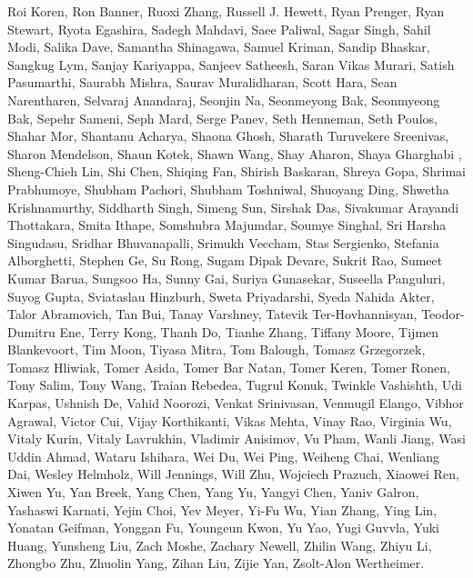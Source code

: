 Roi Koren, Ron Banner, Ruoxi Zhang, Russell J. Hewett, Ryan Prenger, Ryan Stewart, Ryota Egashira, Sadegh Mahdavi, Saee Paliwal, Sagar Singh, Sahil Modi, Salika Dave, Samantha Shinagawa, Samuel Kriman, Sandip Bhaskar, Sangkug Lym, Sanjay Kariyappa, Sanjeev Satheesh, Saran Vikas Murari, Satish Pasumarthi, Saurabh Mishra, Saurav Muralidharan, Scott Hara, Sean Narentharen, Selvaraj Anandaraj, Seonjin Na, Seonmeyong Bak, Seonmyeong Bak, Sepehr Sameni, Seph Mard, Serge Panev, Seth Henneman, Seth Poulos, Shahar Mor, Shantanu Acharya, Shaona Ghosh, Sharath Turuvekere Sreenivas, Sharon Mendelson, Shaun Kotek, Shawn Wang, Shay Aharon, Shaya Gharghabi , Sheng-Chieh Lin, Shi Chen, Shiqing Fan, Shirish Baskaran, Shreya Gopa, Shrimai Prabhumoye, Shubham Pachori, Shubham Toshniwal, Shuoyang Ding, Shwetha Krishnamurthy, Siddharth Singh, Simeng Sun, Sirshak Das, Sivakumar Arayandi Thottakara, Smita Ithape, Somshubra Majumdar, Soumye Singhal, Sri Harsha Singudasu, Sridhar Bhuvanapalli, Srimukh Veccham, Stas Sergienko, Stefania Alborghetti, Stephen Ge, Su Rong, Sugam Dipak Devare, Sukrit Rao, Sumeet Kumar Barua, Sungsoo Ha, Sunny Gai, Suriya Gunasekar, Suseella Panguluri, Suyog Gupta, Sviataslau Hinzburh, Sweta Priyadarshi, Syeda Nahida Akter, Talor Abramovich, Tan Bui, Tanay Varshney, Tatevik Ter-Hovhannisyan, Teodor-Dumitru Ene, Terry Kong, Thanh Do, Tianhe Zhang, Tiffany Moore, Tijmen Blankevoort, Tim Moon, Tiyasa Mitra, Tom Balough, Tomasz Grzegorzek, Tomasz Hliwiak, Tomer Asida, Tomer Bar Natan, Tomer Keren, Tomer Ronen, Tony Salim, Tony Wang, Traian Rebedea, Tugrul Konuk, Twinkle Vashishth, Udi Karpas, Ushnish De, Vahid Noorozi, Venkat Srinivasan, Venmugil Elango, Vibhor Agrawal, Victor Cui, Vijay Korthikanti, Vikas Mehta, Vinay Rao, Virginia Wu, Vitaly Kurin, Vitaly Lavrukhin, Vladimir Anisimov, Vu Pham, Wanli Jiang, Wasi Uddin Ahmad, Wataru Ishihara, Wei Du, Wei Ping, Weiheng Chai, Wenliang Dai, Wesley Helmholz, Will Jennings, Will Zhu, Wojciech Prazuch, Xiaowei Ren, Xiwen Yu, Yan Breek, Yang Chen, Yang Yu, Yangyi Chen, Yaniv Galron, Yashaswi Karnati, Yejin Choi, Yev Meyer, Yi-Fu Wu, Yian Zhang, Ying Lin, Yonatan Geifman, Yonggan Fu, Youngeun Kwon, Yu Yao, Yugi Guvvla, Yuki Huang, Yunsheng Liu, Zach Moshe, Zachary Newell, Zhilin Wang, Zhiyu Li, Zhongbo Zhu, Zhuolin Yang, Zihan Liu, Zijie Yan, Zsolt-Alon Wertheimer.
\newpage